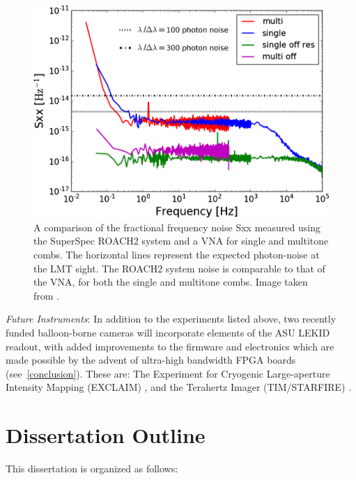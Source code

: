 \begin{figure}[!htbp]
\centering
\includegraphics[width=\textwidth]{figures/intro/superspec_noisecomp}
\caption[~Comparison of the fractional frequency noise measured using the SuperSpec ROACH2 system and a VNA for single and multitone combs.]{A comparison of the fractional frequency noise \gls{Sxx} measured using the SuperSpec ROACH2 system and a VNA for single and multitone combs. The horizontal lines represent the expected photon-noise at the LMT sight. The ROACH2 system noise is comparable to that of the VNA, for both the single and multitone combs. Image taken from \citet{mcgeehan2018low}.}
\label{fig:readout noise comp}
\end{figure}

\vspace{5mm}

\textit{Future Instruments}: In addition to the experiments listed above, two recently funded balloon-borne cameras will incorporate elements of the ASU LEKID readout, with added improvements to the firmware and electronics which are made possible by the advent of ultra-high bandwidth FPGA boards (see~\ref{conclusion}). These are: The Experiment for Cryogenic Large-aperture Intensity Mapping (EXCLAIM) \citep{switzer2017measuring}, and the Terahertz Imager (TIM/STARFIRE) \citep{aguirre2018starfire}.

\section{Dissertation Outline}

This dissertation is organized as follows:

